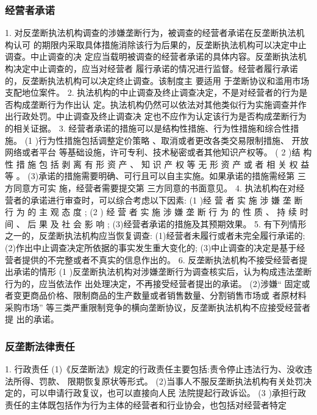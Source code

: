 \documentclass[UTF8,12pt]{ctexart}
\numberwithin{equation}{section} %
\numberwithin{figure}{section}
\numberwithin{table}{section}
\begin{document}
	
	\subsubsection{经营者承诺}
	1. 对反垄断执法机构调查的涉嫌垄断行为，被调查的经营者承诺在反垄断执法机构认可
	的期限内采取具体措施消除该行为后果的，反垄断执法机构可以决定中止调查。中止调查的决
	定应当载明被调查的经营者承诺的具体内容。反垄断执法机构决定中止调查的，应当对经营者
	履行承诺的情况进行监督。经营者履行承诺的，反垄断执法机构可以决定终止调查。该制度主
	要适用 于垄断协议和滥用市场支配地位案件。
	2. 执法机构的中止调查及终止调查决定，不是对经营者的行为是否构成垄断行为作出认
	定。执法机构仍然可以依法对其他类似行为实施调查并作出行政处罚。中止调查及终止调查决
	定也不应作为认定该行为是否构成垄断行为的相关证据。
	3. 经营者承诺的措施可以是结构性措施、行为性措施和综合性措施。
	(1 )行为性措施包括调整定价策略 、取消或者更改各类交易限制措施、 开放网络或者平台
	等基础设施，许可专利、技术秘密或者其他知识产权等。
	( 2 )结 构 性 措 施 包 括 剥 离 有 形 资 产 、 知 识 产 权 等 无 形 资 产 或 者 相 关 权 益 等 。
	(3)承诺的措施需要明确、可行且可以自主实施。如果承诺的措施需经第 三方同意方可实
	施，经营者需要提交第 三方同意的书面意见。
	4. 执法机构在对经营者的承诺进行审查时，可以综合考虑以下因素:
	(1 )经 营 者 实 施 涉 嫌 垄 断 行 为 的 主 观 态 度 ;
	(2 ) 经 营 者 实 施 涉 嫌 垄 断 行 为 的 性 质 、 持 续 时 间 、 后 果 及 社 会 影 响 ;
	(3)经营者承诺的措施及其预期效果。
	5. 有下列情形之一的，反垄断执法机构应当恢复调查:
	(1)经营者未履行或者未完全履行承诺的;
	(2)作出中止调查决定所依据的事实发生重大变化的;
	(3)中止调查的决定是基于经营者提供的不完整或者不真实的信息作出的。
	6. 反垄断执法机构不接受经营者提出承诺的情形
	(1 )反垄断执法机构对涉嫌垄断行为调查核实后，认为构成违法垄断行为的，应当依法作
	出处理决定，不再接受经营者提出的承诺。
	(2)涉嫌“ 固定或者变更商品价格、限制商品的生产数量或者销售数量、分割销售市场或
	者原材料采购市场” 等三类严重限制竞争的横向垄断协议，反垄断执法机构不应接受经营者提
	出的承诺。
	
	\subsubsection{反垄断法律责任}
	1. 行政责任
	(1)《反垄断法》规定的行政责任主要包括:责令停止违法行为、没收违法所得、罚款、
	限期恢复原状等形式。
	(2)当事人不服反垄断执法机构有关处罚决定的，可以申请行政复议，也可以直接向人民
	法院提起行政诉讼。
	(3 )承担行政责任的主体既包括作为行为主体的经营者和行业协会，也包括对经营者特定
	
\end{document}
